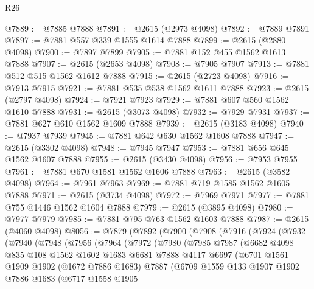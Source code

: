 \begin{lexlean}{R26}
\begin{coremodule}
@7889 := @7885 @7888
@7891 := @2615 (@2973 @4098)
@7892 := @7889 @7891
@7897 := @7881 @557 @339 @1555 @1614 @7888
@7899 := @2615 (@2880 @4098)
@7900 := @7897 @7899
@7905 := @7881 @152 @455 @1562 @1613 @7888
@7907 := @2615 (@2653 @4098)
@7908 := @7905 @7907
@7913 := @7881 @512 @515 @1562 @1612 @7888
@7915 := @2615 (@2723 @4098)
@7916 := @7913 @7915
@7921 := @7881 @535 @538 @1562 @1611 @7888
@7923 := @2615 (@2797 @4098)
@7924 := @7921 @7923
@7929 := @7881 @607 @560 @1562 @1610 @7888
@7931 := @2615 (@3073 @4098)
@7932 := @7929 @7931
@7937 := @7881 @627 @610 @1562 @1609 @7888
@7939 := @2615 (@3183 @4098)
@7940 := @7937 @7939
@7945 := @7881 @642 @630 @1562 @1608 @7888
@7947 := @2615 (@3302 @4098)
@7948 := @7945 @7947
@7953 := @7881 @656 @645 @1562 @1607 @7888
@7955 := @2615 (@3430 @4098)
@7956 := @7953 @7955
@7961 := @7881 @670 @1581 @1562 @1606 @7888
@7963 := @2615 (@3582 @4098)
@7964 := @7961 @7963
@7969 := @7881 @719 @1585 @1562 @1605 @7888
@7971 := @2615 (@3734 @4098)
@7972 := @7969 @7971
@7977 := @7881 @755 @1446 @1562 @1604 @7888
@7979 := @2615 (@3895 @4098)
@7980 := @7977 @7979
@7985 := @7881 @795 @763 @1562 @1603 @7888
@7987 := @2615 (@4060 @4098)
@8056 := @7879
    (@7892
      (@7900
        (@7908
          (@7916
            (@7924
              (@7932
                (@7940
                  (@7948
                    (@7956
                      (@7964
                        (@7972
                          (@7980
                            (@7985
                              @7987
                              (@6682
                                @4098
                                @835
                                @108
                                @1562
                                @1602
                                @1683
                                @6681
                                @7888
                                @4117
                                @6697
                                (@6701
                                  @1561
                                  @1909
                                  @1902
                                  (@1672 @7886 @1683)
                                  @7887
                                  (@6709
                                    @1559
                                    @133
                                    @1907
                                    @1902
                                    @7886
                                    @1683
                                    (@6717
                                      @1558
                                      @1905

\end{coremodule}
\end{lexlean}
